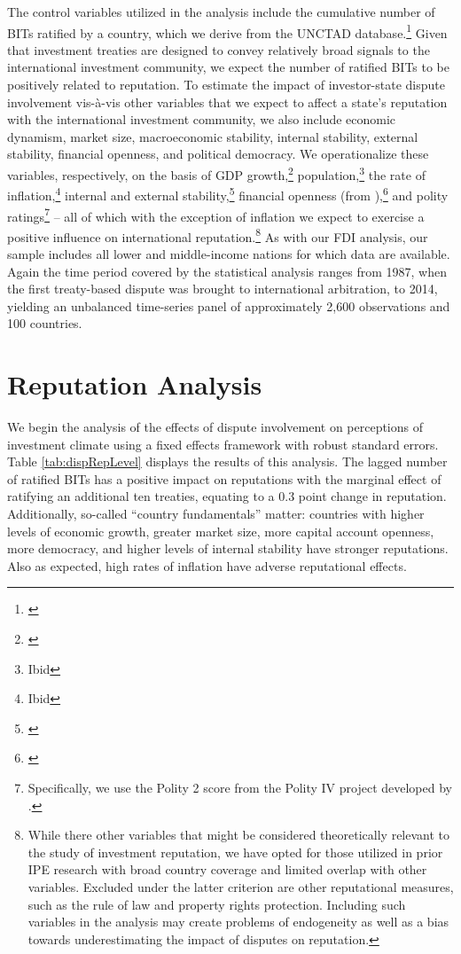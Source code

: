 \documentclass[12pt,onesided]{amsart}
\begin{document}
 The control variables utilized in the analysis include the cumulative number of BITs ratified by a country, which we derive from the UNCTAD database.\footnote{\citet{unctad:2013c}} Given that investment treaties are designed to convey relatively broad signals to the international investment community, we expect the number of ratified BITs to be positively related to reputation. To estimate the impact of investor-state dispute involvement vis-\`{a}-vis other variables that we expect to affect a state's reputation with the international investment community, we also include economic dynamism, market size, macroeconomic stability, internal stability, external stability, financial openness, and political democracy. We operationalize these variables, respectively, on the basis of GDP growth,\footnote{\citet{worldbank:2013}} population,\footnote{Ibid} the rate of inflation,\footnote{Ibid} internal and external stability,\footnote{\citet{prs:2013}} financial openness (from \citeauthor{chinn:ito:2008}),\footnote{\citet{chinn:ito:2008}} and polity ratings\footnote{Specifically, we use the Polity 2 score from the Polity IV project developed by \citet{marshall2013polity}.} -- all of which with the exception of inflation we expect to exercise a positive influence on international reputation.\footnote{While there other variables that might be considered theoretically relevant to the study of investment reputation, we have opted for those utilized in prior IPE research with broad country coverage and limited overlap with other variables. Excluded under the latter criterion are other reputational measures, such as the rule of law and property rights protection. Including such variables in the analysis may create problems of endogeneity as well as a bias towards underestimating the impact of disputes on reputation.} As with our FDI analysis, our sample includes all lower and middle-income nations for which data are available. Again the time period covered by the statistical analysis ranges from 1987, when the first treaty-based dispute was brought to international arbitration, to 2014, yielding an unbalanced time-series panel of approximately 2,600 observations and 100 countries.

\section*{Reputation Analysis}

We begin the analysis of the effects of dispute involvement on perceptions of investment climate using a fixed effects framework with robust standard errors. Table \ref{tab:dispRepLevel} displays the results of this analysis. The lagged number of ratified BITs has a positive impact on reputations with the marginal effect of ratifying an additional ten treaties, equating to a 0.3 point change in reputation. Additionally, so-called ``country fundamentals'' matter: countries with higher levels of economic growth, greater market size, more capital account openness, more democracy, and higher levels of internal stability have stronger reputations. Also as expected, high rates of inflation have adverse reputational effects.
\end{document}
